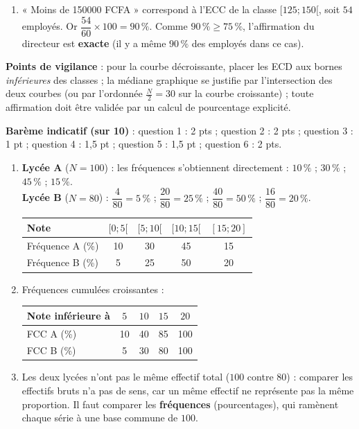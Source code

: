 \documentclass[11pt]{article}
\begin{document}
\begin{corrige}
\begin{enumerate}
\item « Moins de \num{150000} FCFA » correspond à l'ECC de la classe $[125 ; 150[$, soit $54$ employés. Or $\dfrac{54}{60}\times 100 = 90\,\%$. Comme $90\,\% \geq 75\,\%$, l'affirmation du directeur est \textbf{exacte} (il y a même $90\,\%$ des employés dans ce cas).
\end{enumerate}
\textbf{Points de vigilance} : pour la courbe décroissante, placer les ECD aux bornes \emph{inférieures} des classes ; la médiane graphique se justifie par l'intersection des deux courbes (ou par l'ordonnée $\frac{N}{2}=30$ sur la courbe croissante) ; toute affirmation doit être validée par un calcul de pourcentage explicité.
\end{corrige}

\begin{corrige}
\textbf{Barème indicatif (sur 10)} : question 1 : 2 pts ; question 2 : 2 pts ; question 3 : 1 pt ; question 4 : 1,5 pt ; question 5 : 1,5 pt ; question 6 : 2 pts.
\begin{enumerate}
\item \textbf{Lycée A} ($N=100$) : les fréquences s'obtiennent directement : $10\,\%$ ; $30\,\%$ ; $45\,\%$ ; $15\,\%$.\\
\textbf{Lycée B} ($N=80$) : $\dfrac{4}{80}=5\,\%$ ; $\dfrac{20}{80}=25\,\%$ ; $\dfrac{40}{80}=50\,\%$ ; $\dfrac{16}{80}=20\,\%$.
\begin{center}
\begin{tabular}{|l|c|c|c|c|}
\hline
Note & $[0 ; 5[$ & $[5 ; 10[$ & $[10 ; 15[$ & $[15 ; 20]$ \\
\hline
Fréquence A (\%) & 10 & 30 & 45 & 15 \\
\hline
Fréquence B (\%) & 5 & 25 & 50 & 20 \\
\hline
\end{tabular}
\end{center}
\item Fréquences cumulées croissantes :
\begin{center}
\begin{tabular}{|l|c|c|c|c|}
\hline
Note inférieure à & $5$ & $10$ & $15$ & $20$ \\
\hline
FCC A (\%) & 10 & 40 & 85 & 100 \\
\hline
FCC B (\%) & 5 & 30 & 80 & 100 \\
\hline
\end{tabular}
\end{center}
\item Les deux lycées n'ont pas le même effectif total ($100$ contre $80$) : comparer les effectifs bruts n'a pas de sens, car un même effectif ne représente pas la même proportion. Il faut comparer les \textbf{fréquences} (pourcentages), qui ramènent chaque série à une base commune de $100$.

\end{enumerate}
\end{corrige}
\end{document}
